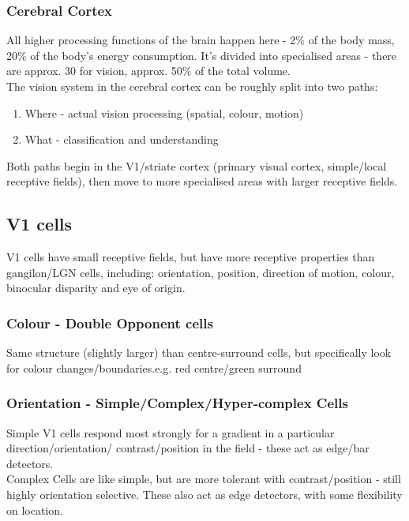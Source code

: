 \subsubsection{Cerebral Cortex}
All higher processing functions of the brain happen here - 2\% of the body mass, 20\% of the body's energy consumption. It's divided into specialised areas - there are approx. 30 for vision, approx. 50\% of the total volume. \\

The vision system in the cerebral cortex can be roughly split into two paths:
\begin{enumerate}
    \item Where - actual vision processing (spatial, colour, motion)
    \item What - classification and understanding
\end{enumerate}
Both paths begin in the V1/striate cortex (primary visual cortex, simple/local receptive fields), then move to more specialised areas with larger receptive fields.

\subsection{V1 cells}
V1 cells have small receptive fields, but have more receptive properties than gangilon/LGN cells, including: orientation, position, direction of motion, colour, binocular disparity and eye of origin. 

\subsubsection{Colour - Double Opponent cells}
Same structure (slightly larger) than centre-surround cells, but specifically look for colour changes/boundaries.e.g. red centre/green surround

\subsubsection{Orientation - Simple/Complex/Hyper-complex Cells}
Simple V1 cells respond most strongly for a gradient in a particular direction/orientation/ contrast/position in the field - these act as edge/bar detectors. \\

Complex Cells are like simple, but are more tolerant with contrast/position - still highly orientation selective. These also act as edge detectors, with some flexibility on location.\\


